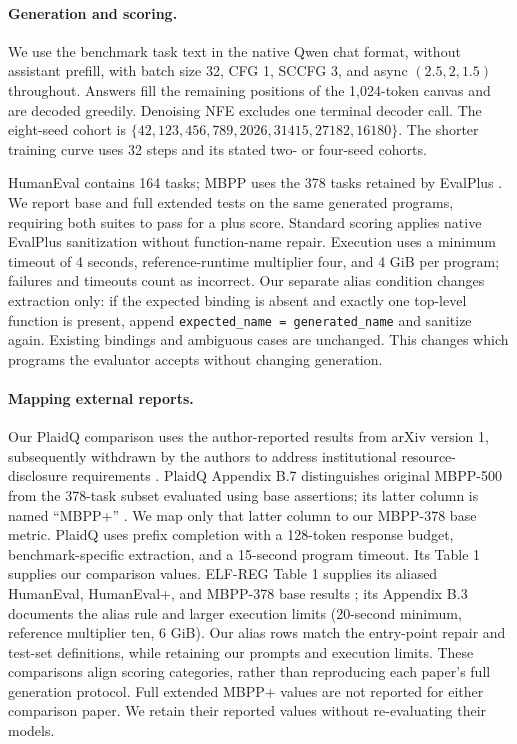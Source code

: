 \documentclass{article}
\begin{document}
\paragraph{Generation and scoring.}
We use the benchmark task text in the native Qwen chat format, without assistant prefill, with batch size 32, CFG 1, SCCFG 3, and async $(2.5,2,1.5)$ throughout. Answers fill the remaining positions of the 1,024-token canvas and are decoded greedily. Denoising NFE excludes one terminal decoder call. The eight-seed cohort is $\{42,123,456,789,2026,31415,27182,16180\}$. The shorter training curve uses 32 steps and its stated two- or four-seed cohorts.

HumanEval \citep{humaneval} contains 164 tasks; MBPP \citep{mbpp} uses the 378 tasks retained by EvalPlus \citep{evalplus}. We report base and full extended tests on the same generated programs, requiring both suites to pass for a plus score. Standard scoring applies native EvalPlus sanitization without function-name repair. Execution uses a minimum timeout of 4 seconds, reference-runtime multiplier four, and 4 GiB per program; failures and timeouts count as incorrect. Our separate alias condition changes extraction only: if the expected binding is absent and exactly one top-level function is present, append \texttt{expected\_name = generated\_name} and sanitize again. Existing bindings and ambiguous cases are unchanged. This changes which programs the evaluator accepts without changing generation.

\paragraph{Mapping external reports.}
Our PlaidQ comparison uses the author-reported results from arXiv version 1, subsequently withdrawn by the authors to address institutional resource-disclosure requirements \citep{plaidq}. PlaidQ Appendix B.7 distinguishes original MBPP-500 from the 378-task subset evaluated using base assertions; its latter column is named ``MBPP+'' \citep{plaidq}. We map only that latter column to our MBPP-378 base metric. PlaidQ uses prefix completion with a 128-token response budget, benchmark-specific extraction, and a 15-second program timeout. Its Table 1 supplies our comparison values. ELF-REG Table 1 supplies its aliased HumanEval, HumanEval+, and MBPP-378 base results \citep{scalingdlm}; its Appendix B.3 documents the alias rule and larger execution limits (20-second minimum, reference multiplier ten, 6 GiB). Our alias rows match the entry-point repair and test-set definitions, while retaining our prompts and execution limits. These comparisons align scoring categories, rather than reproducing each paper's full generation protocol. Full extended MBPP+ values are not reported for either comparison paper. We retain their reported values without re-evaluating their models.
\end{document}
